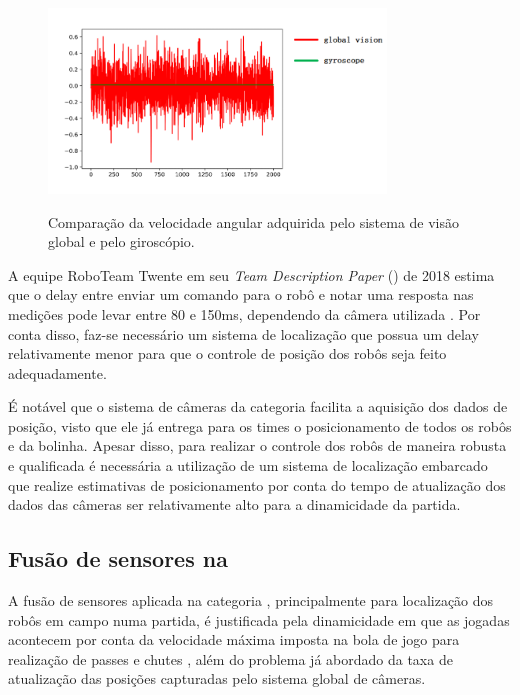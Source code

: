 \documentclass[acronym, symbols, table]{fei}
\begin{document}
			\begin{figure}[!htb]
					\centering
					\caption{Comparação da velocidade angular adquirida pelo sistema de visão global e pelo giroscópio.} 
					\includegraphics[width=0.8\textwidth]{Comparacao_cameras_giroscopio.png}
					\label{fig:comparison_cameras_gyroscope}
				\end{figure}
		
			A equipe RoboTeam Twente em seu \textit{Team Description Paper} () de 2018 estima que o delay entre enviar um comando para o robô e notar uma resposta nas medições pode levar entre 80 e 150ms, dependendo da câmera utilizada \cite{tdptwente2018}. Por conta disso, faz-se necessário um sistema de localização que possua um delay relativamente menor para que o controle de posição dos robôs seja feito adequadamente.
			
			É notável que o sistema de câmeras da categoria  facilita a aquisição dos dados de posição, visto que ele já entrega para os times o posicionamento de todos os robôs e da bolinha. Apesar disso, para realizar o controle dos robôs de maneira robusta e qualificada é necessária a utilização de um sistema de localização embarcado que realize estimativas de posicionamento por conta do tempo de atualização dos dados das câmeras ser relativamente alto para a dinamicidade da partida.
			
			\subsection{Fusão de sensores na } \label{sec:fusao_sensores_ssl}
			
				A fusão de sensores aplicada na categoria , principalmente para localização dos robôs em campo numa partida, é justificada pela dinamicidade em que as jogadas acontecem por conta da velocidade máxima imposta na bola de jogo para realização de passes e chutes \cite{rules}, além do problema já abordado da taxa de atualização das posições capturadas pelo sistema global de câmeras.
				
\end{document}
